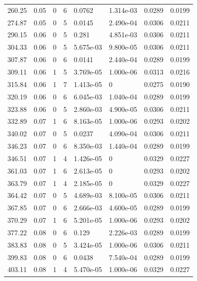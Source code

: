 \documentclass[preview]{standalone}
\begin{document}
{{{\begin{tabular}{L{1.2cm}C{1.2cm} C{0.3cm}C{0.5cm} C{1.4cm}C{1.4cm} C{1.4cm}C{1.4cm}}
  260.25  &  0.05  & 0     &  6 &  0.0762  & 1.314e-03  & 0.0289 &  0.0199   \\ 
  274.87  &  0.05  & 0     &  5 &  0.0145  & 2.490e-04  & 0.0306 &  0.0211   \\ 
  290.15  &  0.06  & 0     &  5 &  0.281  & 4.851e-03  & 0.0306 &  0.0211   \\ 
  304.33  &  0.06  & 0     &  5 &  5.675e-03  & 9.800e-05  & 0.0306 &  0.0211   \\ 
  307.87  &  0.06  & 0     &  6 &  0.0141  & 2.440e-04  & 0.0289 &  0.0199   \\ 
  309.11  &  0.06  & 1     &  5 &  3.769e-05  & 1.000e-06  & 0.0313 &  0.0216   \\ 
  315.84  &  0.06  & 1     &  7 &  1.413e-05  & 0  & 0.0275 &  0.0190   \\ 
  320.19  &  0.06  & 0     &  6 &  6.045e-03  & 1.040e-04  & 0.0289 &  0.0199   \\ 
  323.88  &  0.06  & 0     &  5 &  2.860e-03  & 4.900e-05  & 0.0306 &  0.0211   \\ 
  332.89  &  0.07  & 1     &  6 &  8.163e-05  & 1.000e-06  & 0.0293 &  0.0202   \\ 
  340.02  &  0.07  & 0     &  5 &  0.0237  & 4.090e-04  & 0.0306 &  0.0211   \\ 
  346.23  &  0.07  & 0     &  6 &  8.350e-03  & 1.440e-04  & 0.0289 &  0.0199   \\ 
  346.51  &  0.07  & 1     &  4 &  1.426e-05  & 0  & 0.0329 &  0.0227   \\ 
  361.03  &  0.07  & 1     &  6 &  2.613e-05  & 0  & 0.0293 &  0.0202   \\ 
  363.79  &  0.07  & 1     &  4 &  2.185e-05  & 0  & 0.0329 &  0.0227   \\ 
  364.42  &  0.07  & 0     &  5 &  4.689e-03  & 8.100e-05  & 0.0306 &  0.0211   \\ 
  367.85  &  0.07  & 0     &  6 &  2.666e-03  & 4.600e-05  & 0.0289 &  0.0199   \\ 
  370.29  &  0.07  & 1     &  6 &  5.201e-05  & 1.000e-06  & 0.0293 &  0.0202   \\ 
  377.22  &  0.08  & 0     &  6 &  0.129  & 2.226e-03  & 0.0289 &  0.0199   \\ 
  383.83  &  0.08  & 0     &  5 &  3.424e-05  & 1.000e-06  & 0.0306 &  0.0211   \\ 
  399.83  &  0.08  & 0     &  6 &  0.0438  & 7.540e-04  & 0.0289 &  0.0199   \\ 
  403.11  &  0.08  & 1     &  4 &  5.470e-05  & 1.000e-06  & 0.0329 &  0.0227   \\ 

\end{tabular}}}}
\end{document}

